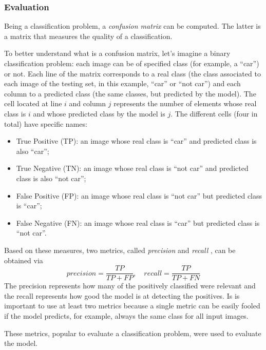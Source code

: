 \subsubsection{Evaluation}

Being a classification problem, a \emph{confusion matrix} can be computed. The latter is a matrix that measures the quality of a classification.

To better understand what is a confusion matrix, let's imagine a binary classification problem: each image can be of specified class (for example, a \enquote{car}) or not. Each line of the matrix corresponds to a real class (the class associated to each image of the testing set, in this example, \enquote{car} or \enquote{not car}) and each column to a predicted class (the same classes, but predicted by the model). The cell located at line $i$ and column $j$ represents the number of elements whose real class is $i$ and whose predicted class by the model is $j$. The different cells (four in total) have specific names:

\begin{itemize}
    \item True Positive (TP): an image whose real class is \enquote{car} and predicted class is also \enquote{car};
    \item True Negative (TN): an image whose real class is \enquote{not car} and predicted class is also \enquote{not car};
    \item False Positive (FP): an image whose real class is \enquote{not car} but predicted class is \enquote{car};
    \item False Negative (FN): an image whose real class is \enquote{car} but predicted class is \enquote{not car}.
\end{itemize}

Based on these measures, two metrics, called \emph{precision} and \emph{recall} \cite{hossin2015review}, can be obtained via
\begin{equation*}
    precision = \frac{TP}{TP + FP}, \quad recall = \frac{TP}{TP + FN}
\end{equation*}
The precision represents how many of the positively classified were relevant and the recall represents how good the model is at detecting the positives. Is is important to use at least two metrics because a single metric can be easily fooled if the model predicts, for example, always the same class for all input images.

These metrics, popular to evaluate a classification problem, were used to evaluate the model.

